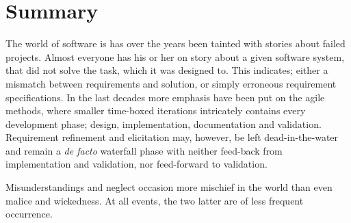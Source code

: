 \chapter{Summary}
The world of software is has over the years been tainted with stories about failed projects. Almost everyone has his or her on story about a given software system, that did not solve the task, which it was designed to. This indicates; either a mismatch between requirements and solution, or simply erroneous requirement specifications. In the last decades more emphasis have been put on the agile methods, where smaller time-boxed iterations intricately contains every development phase; design, implementation, documentation and validation. Requirement refinement and elicitation may, however, be left dead-in-the-water and remain a \emph{de facto} waterfall phase with neither feed-back from implementation and validation, nor feed-forward to validation.
\newpage
\begin{fquote}Misunderstandings and neglect occasion more mischief in the world than even malice and wickedness. At all events, the two latter are of less frequent occurrence.
\end{fquote}